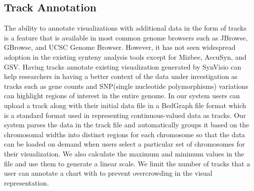 \subsection{Track Annotation}
The ability to annotate visualizations with additional data in the form of tracks is a feature that is available in most common genome browsers such as JBrowse, GBrowse, and UCSC Genome Browser\cite{skinner2009jbrowse,donlin2009using,karolchik2003ucsc}. However, it has not seen widespread adoption in the existing synteny analysis tools except for Mizbee,  AccuSyn, and GSV\cite{Meyer2009,accusyn,revanna2012web}.  Having tracks annotate existing visualization generated by SynVisio can help researchers in having a better context of the data under investigation as tracks such as gene counts and SNP(single nucleotide polymorphisms) variations can highlight regions of interest in the entire genome. In our system users can upload a track along with their initial data file in a BedGraph file format which is a standard format used in representing continuous-valued data as tracks. Our system parses the data in the track file and automatically groups it based on the chromosomal widths into distinct regions for each chromosome so that the data can be loaded on demand when users select a particular set of chromosomes for their visualization. We also calculate the maximum and minimum values in the file and use them to generate a linear scale. We limit the number of tracks that a user can annotate a chart with to prevent overcrowding in the visual representation.


